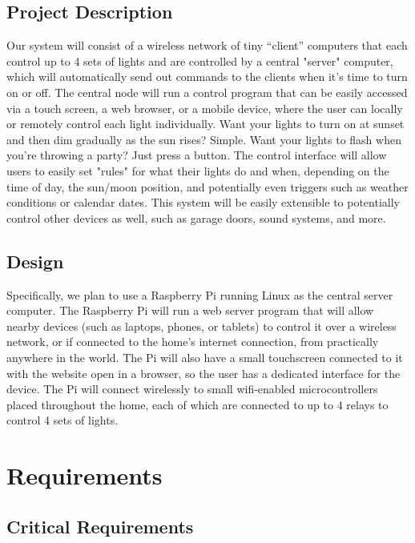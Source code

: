 \documentclass[12pt]{article}
\begin{document}
\subsection{Project Description}

Our system will consist of a wireless network of tiny “client” computers that
each control up to 4 sets of lights and are controlled by a central "server"
computer, which will automatically send out commands to the clients when it's
time to turn on or off.  The central node will run a control program that can
be easily accessed via a touch screen, a web browser, or a mobile device, where
the user can locally or remotely control each light individually.  Want your
lights to turn on at sunset and then dim gradually as the sun rises?  Simple.
Want your lights to flash when you're throwing a party?  Just press a button.
The control interface will allow users to easily set "rules" for what their
lights do and when, depending on the time of day, the sun/moon position, and
potentially even triggers such as weather conditions or calendar dates.  This
system will be easily extensible to potentially control other devices as well,
such as garage doors, sound systems, and more.

\subsection{Design}

Specifically, we plan to use a Raspberry Pi running Linux as the central server
computer.  The Raspberry Pi will run a web server program that will allow
nearby devices (such as laptops, phones, or tablets) to control it over a
wireless network, or if connected to the home's internet connection, from
practically anywhere in the world.  The Pi will also have a small touchscreen
connected to it with the website open in a browser, so the user has a dedicated
interface for the device.  The Pi will connect wirelessly to small wifi-enabled
microcontrollers placed throughout the home, each of which are connected to up
to 4 relays to control 4 sets of lights.

\section{Requirements}

\subsection{Critical Requirements}
\end{document}
